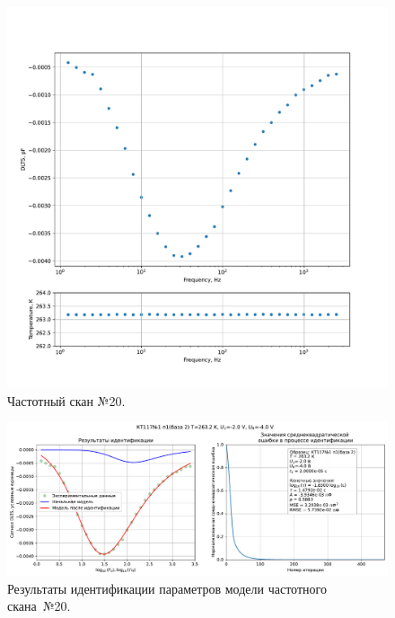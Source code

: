 \begin{figure}[!ht]
    \centering
    \includegraphics[width=1\textwidth]{../plots/КТ117№1_п1(база 2)_2500Гц-1Гц_1пФ_-10С_-2В-4В_100мВ_20мкс_шаг_0,1.pdf}
    \caption{Частотный скан №20.}
    \label{pic:frequency_scan_20}
\end{figure}

\begin{figure}[!ht]
    \centering
    \includegraphics[width=1\textwidth]{../plots/КТ117№1_п1(база 2)_2500Гц-1Гц_1пФ_-10С_-2В-4В_100мВ_20мкс_шаг_0,1_model.pdf}
    \caption{Результаты идентификации параметров модели частотного скана~№20.}
    \label{pic:frequency_scan_model20}
\end{figure}

\pagebreak


